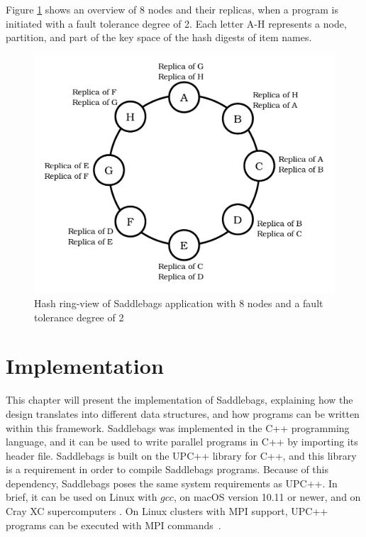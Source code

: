 \documentclass{uit-report}
\begin{document}
Figure \ref{fig:ring} shows an overview of 8 nodes and their replicas, when a program is initiated with a fault tolerance degree of 2. Each letter A-H represents a node, partition, and part of the key space of the hash digests of item names.

\vspace{1.5cm}
\begin{figure}[H]
	\centering
	\includegraphics[width=15cm]{illustrations/ring.pdf}
	\caption{Hash ring-view of Saddlebags application with 8 nodes and a fault tolerance degree of 2}
	\label{fig:ring}
\end{figure}

\newpage
\mbox{}
\newpage
\chapter{Implementation}
This chapter will present the implementation of Saddlebags, explaining how the design translates into different data structures, and how programs can be written within this framework. Saddlebags was implemented in the C++ programming language, and it can be used to write parallel programs in C++ by importing its header file. Saddlebags is built on the UPC++ library for C++, and this library is a requirement in order to compile Saddlebags programs. Because of this dependency, Saddlebags poses the same system requirements as UPC++. In brief, it can be used on Linux with $gcc$, on macOS version 10.11 or newer, and on Cray XC supercomputers \cite{upcreq}. On Linux clusters with MPI support, UPC++ programs can be executed with MPI commands~\cite{upcmpi}.
\end{document}
